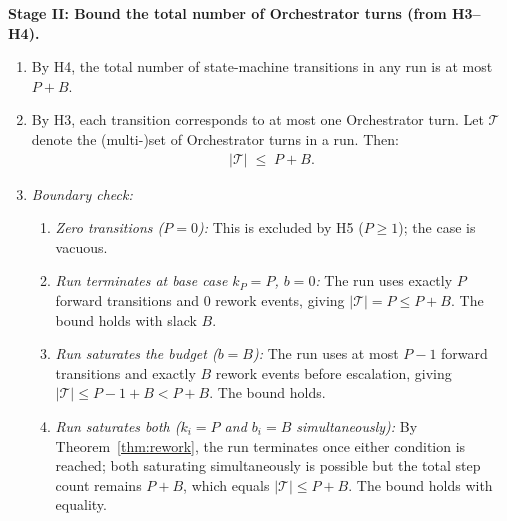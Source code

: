 \documentclass[12pt]{article}
\theoremstyle{definition}
\begin{document}
\medskip
\noindent\textbf{Stage II: Bound the total number of Orchestrator
turns (from H3--H4).}
\begin{enumerate}
    \item[II.1] By H4, the total number of state-machine transitions in
                any run is at most $P + B$.
    \item[II.2] By H3, each transition corresponds to at most one
                Orchestrator turn.  Let $\mathcal{T}$ denote the
                (multi-)set of Orchestrator turns in a run.  Then:
                \begin{align}
                    \label{eq:turn-bound}
                    |\mathcal{T}| \;\leq\; P + B.
                \end{align}
    \item[II.3] \emph{Boundary check:}
                \begin{enumerate}
                    \item[II.3a] \emph{Zero transitions ($P=0$):}
                                 This is excluded by H5 ($P \geq 1$);
                                 the case is vacuous.
                    \item[II.3b] \emph{Run terminates at base case
                                 $k_P = P$, $b = 0$:}
                                 The run uses exactly $P$ forward
                                 transitions and $0$ rework events,
                                 giving $|\mathcal{T}| = P \leq P + B$.
                                 The bound holds with slack $B$.
                    \item[II.3c] \emph{Run saturates the budget
                                 ($b = B$):}
                                 The run uses at most $P-1$ forward
                                 transitions and exactly $B$ rework
                                 events before escalation, giving
                                 $|\mathcal{T}| \leq P - 1 + B < P + B$.
                                 The bound holds.
                    \item[II.3d] \emph{Run saturates both ($k_i = P$
                                 and $b_i = B$ simultaneously):}
                                 By Theorem~\ref{thm:rework}, the run
                                 terminates once either condition is
                                 reached; both saturating simultaneously
                                 is possible but the total step count
                                 remains $P + B$, which equals
                                 $|\mathcal{T}| \leq P + B$.  The bound
                                 holds with equality.
                \end{enumerate}
\end{enumerate}
\end{document}
